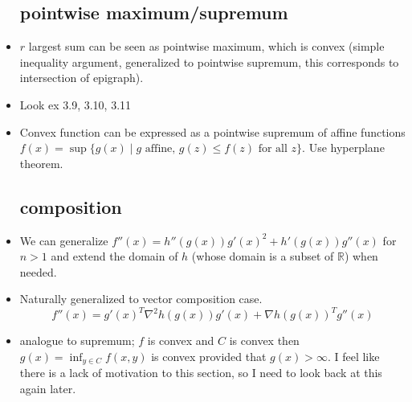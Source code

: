 \documentclass{article}
\theoremstyle{remark}
\begin{document}
\begin{itemize}
     \subsection*{pointwise maximum/supremum}
     \item $r$ largest sum can be seen as pointwise maximum, which is convex (simple inequality argument, generalized to pointwise supremum, this corresponds to intersection of epigraph).
     \item Look ex 3.9, 3.10, 3.11
     \item Convex function can be expressed as a pointwise supremum of affine functions $f(x)=\sup\{g(x)\mid g\text{ affine, }g(z)\leq f(z)\text{ for all } z\}$. Use hyperplane theorem.
     \subsection*{composition}
     \item We can generalize $f''(x)=h''(g(x))g'(x)^2+h'(g(x))g''(x)$ for $n>1$ and extend the domain of $h$ (whose domain is a subset of $\mathbb{R}$) when needed.
    \item Naturally generalized to vector composition case. 
    $$f''(x)=g'(x)^T \nabla^2 h(g(x))g'(x)+\nabla h(g(x))^T g''(x)$$
    \item analogue to supremum; $f$ is convex and $C$ is convex then $g(x)=\inf_{y\in C} f(x,y)$ is convex provided that $g(x)>\infty$. I feel like there is a lack of motivation to this section, so I need to look back at this again later.

\end{itemize}
\end{document}
